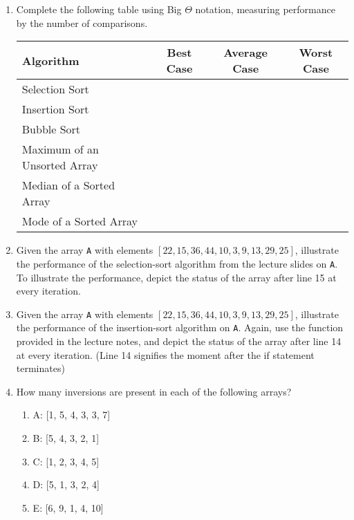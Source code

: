 \documentclass[11pt]{article}
\begin{document}
\begin{enumerate}[leftmargin=*]
    \pagebreak
    \item Complete the following table using Big $\Theta$ notation, measuring performance by the number of comparisons.
    \begin{center}
        \begin{tabular}{l | c | c | c }
            Algorithm & Best Case & Average Case & Worst Case \\ \hline
            Selection Sort & & & \\ \hline
            Insertion Sort & & & \\ \hline
            Bubble Sort & & & \\ \hline
            Maximum of an Unsorted Array & & & \\ \hline
            Median of a Sorted Array & & & \\ \hline
            Mode of a Sorted Array & & & \\ \hline
        \end{tabular}
    \end{center}
    
    \item Given the array \verb|A| with elements $[22, 15, 36, 44, 10, 3, 9, 13, 29, 25]$, illustrate the performance of the selection-sort algorithm from the lecture slides on \verb|A|. To illustrate the performance, depict the status of the array after line 15 at every iteration.
    
    \item Given the array \verb|A| with elements $[22, 15, 36, 44, 10, 3, 9, 13, 29, 25]$, illustrate the performance of the insertion-sort algorithm on \verb|A|. Again, use the function provided in the lecture notes, and depict the status of the array after line 14 at every iteration. (Line 14 signifies the moment after the if statement terminates)
    
    \item How many inversions are present in each of the following arrays?
    \begin{enumerate}
        \item[] A: [1, 5, 4, 3, 3, 7]
        \item[] B: [5, 4, 3, 2, 1]
        \item[] C: [1, 2, 3, 4, 5]
        \item[] D: [5, 1, 3, 2, 4]
        \item[] E: [6, 9, 1, 4, 10]
    \end{enumerate}
    
\end{enumerate}

\label{r:lastpage}
\end{document}
